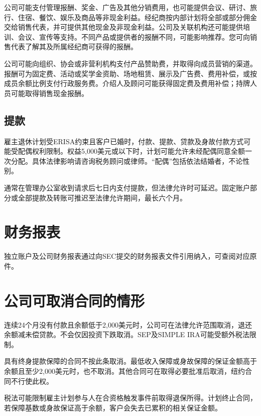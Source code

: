 \documentclass[UTF8,fontset=none,11pt,a4paper]{ctexart}
\begin{document}
公司可能支付管理报酬、奖金、广告及其他分销费用，也可能提供会议、研讨、旅行、住宿、餐饮、娱乐及商品等非现金利益。经纪商按内部计划将全部或部分佣金交给销售代表，并可提供其他现金及非现金利益。公司及关联机构还可能提供培训、会议、宣传等支持。不同产品或提供者的报酬不同，可能影响推荐。您可向销售代表了解其及所属经纪商可获\allowbreak\mbox{得的报酬。}


公司可能向组织、协会或非营利机构支付产品赞助费，并取得向成员营销的渠道。报酬可为固定费、活动或奖学金资助、场地租赁、展示及广告费、费用补偿，或按成员余额比例支付行政服务费。介绍人及顾问可能获得固定费及费用补偿；持牌人员可能取得销售\allowbreak\mbox{现金报酬。}


\subsection*{提款}
雇主退休计划受ERISA约束且客户已婚时，付款、提款、贷款及身故付款方式可能受配偶权利限制。权益5,000美元或以下时，计划可能允许未经配偶同意全额一次分配。具体法律影响请咨询税务顾问或律师。“配偶”包括依法结婚者，\allowbreak\mbox{不论性别。}


通常在管理办公室收到请求后七日内支付提款，但法律允许时可延迟。固定账户部分或全部提款及转账可推迟至法律允许期间，最\allowbreak\mbox{长六个月。}


\section*{财务报表}
独立账户及公司财务报表通过向SEC提交的财务报表文件引用纳入，可查阅对\allowbreak\mbox{应原件。}


\section*{公司可取消合同的情形}
连续24个月没有付款且余额低于2,000美元时，公司可在法律允许范围取消，退还余额减未偿贷款。不会仅因投资下跌取消。SEP及SIMPLE IRA可能受额外\allowbreak\mbox{税法限制。}


具有终身提款保障的合同不按此条取消。最低收入保障或身故保障的保证金额高于余额且至少2,000美元时，也不取消。其他合同可在取得必要批准后取消，纽约合同不\allowbreak\mbox{行使此权。}


税法可能限制雇主计划参与人在合资格触发事件前取得退保所得。计划终止合同，若保障基数或身故保证高于余额，客户会失去已累积的相关\allowbreak\mbox{保证金额。}
\end{document}
